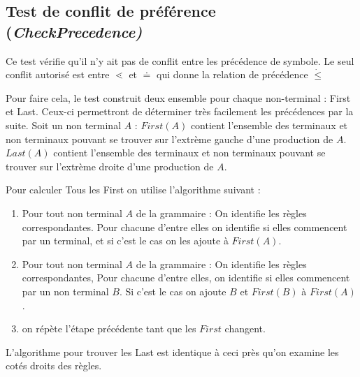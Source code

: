 	\subsection{Test de conflit de préférence (\emph{CheckPrecedence)}}
		Ce test vérifie qu'il n'y ait pas de conflit entre les précédence
		de symbole. Le seul conflit autorisé est entre $\lessdot$ et $\doteq$ qui donne
		la relation de précédence $\dot{\leq}$

		Pour faire cela, le test construit deux ensemble pour chaque non-terminal :
		First et Last. Ceux-ci permettront de déterminer très facilement les précédences
		par la suite. Soit un non terminal $A$ : $First(A)$ contient l'ensemble des terminaux et non terminaux 
		pouvant se trouver sur l'extrème gauche d'une production de $A$. $Last(A)$ contient l'ensemble
		des terminaux et non terminaux pouvant se trouver sur l'extrème droite d'une production de $A$. 

		Pour calculer Tous les First on utilise l'algorithme suivant :
		\begin{enumerate}
			\item Pour tout non terminal $A$ de la grammaire : On identifie les règles correspondantes.
			Pour chacune d'entre elles on identifie si elles commencent par un terminal, et si
			c'est le cas on les ajoute à $First(A)$. 
			\item Pour tout non terminal $A$ de la grammaire : On identifie les règles correspondantes,
			Pour chacune d'entre elles, on identifie si elles commencent par un non terminal $B$.
			Si c'est le cas on ajoute $B$ et $First(B)$ à $First(A)$. 
			\item on répète l'étape précédente tant que les $First$ changent.
		\end{enumerate}
		L'algorithme pour trouver les Last est identique à ceci près qu'on examine les cotés droits des règles.
		
